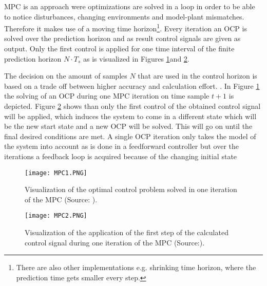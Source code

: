 MPC is an approach were optimizations are solved in a loop in order to be able to notice disturbances, changing environments and model-plant mismatches. Therefore it makes use of a moving time horizon\footnote{There are also other implementations e.g. shrinking time horizon, where the prediction time gets smaller every step.}. Every iteration an OCP is solved over the prediction horizon and as result control signals are given as output. Only the first control is applied for one time interval of the finite prediction horizon $N\cdot T_{s}$ as is visualized in Figures \ref{fig:MPC1}and \ref{fig:MPC2}.

The decision on the amount of samples $N$ that are used in the control horizon is based on a trade off between higher accuracy and calculation effort. \cite{TongDuySon2019, Mercy2018}. In Figure \ref{fig:MPC1} the solving of an OCP during one MPC iteration on time sample $t+1$ is depicted. Figure \ref{fig:MPC2} shows than only the first control of the obtained control signal will be applied, which induces the system to come in a different state which will be the new start state and a new OCP will be solved. This will go on until the final desired conditions are met. A single OCP iteration only takes the model of the system into account as is done in a feedforward controller but over the iterations a feedback loop is acquired because of the changing initial state \cite{Patrinos2019}\\

\begin{figure}[h!]
	\centering
	\texttt{[image: MPC1.PNG]}
	\caption{Visualization of the optimal control problem solved in one iteration of the MPC (Source: \cite{Patrinos2019}).}
	\label{fig:MPC1}
\end{figure}

\begin{figure}[h!]
	\centering
	\texttt{[image: MPC2.PNG]}
	\caption{Visualization of the application of the first step of the calculated control signal during one iteration of the MPC (Source:\cite{Patrinos2019}).}
	\label{fig:MPC2}
\end{figure}

\newpage







